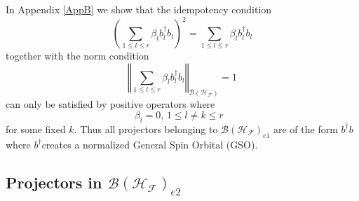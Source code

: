\documentclass[aps,preprint]{revtex4}%
\begin{document}
In Appendix \ref{AppB} we show that the idempotency condition
\begin{equation}
\left(  \sum_{1\leq l\leq r}\beta_{l}b_{l}^{\dagger}b_{l}\right)  ^{2}%
=\sum_{1\leq l\leq r}\beta_{l}b_{l}^{\dagger}b_{l}%
\end{equation}
together with the norm condition
\begin{equation}
\left\Vert \sum_{1\leq l\leq r}\beta_{l}b_{l}^{\dagger}b_{l}\right\Vert
_{\mathcal{B}\left(  \mathcal{H}_{\mathcal{F}}\right)  }=1
\end{equation}
can only be satisfied by positive operators where
\begin{equation}
\beta_{l}=0,\,1\leq l\neq k\leq r\text{ }%
\end{equation}
for some fixed $k.$ Thus all projectors belonging to $\mathcal{B}\left(
\mathcal{H}_{\mathcal{F}}\right)  _{e1}$ are of the form $b^{\dagger}b$ where
$b^{\dagger}$creates a normalized General Spin Orbital (GSO).

\subsection{Projectors in $\mathcal{B}\left(  \mathcal{H}_{\mathcal{F}%
}\right)  _{e2}$ \label{Proj2}}
\end{document}
